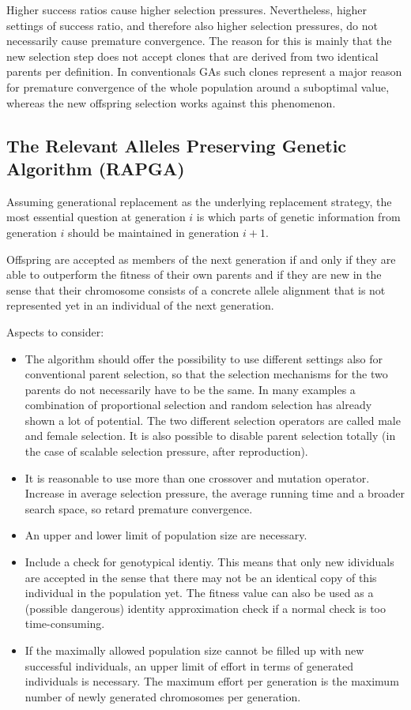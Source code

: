 \documentclass[12pt]{article}
\begin{document}
Higher success ratios cause higher selection pressures. Nevertheless, higher settings of success ratio, and therefore also higher selection pressures, do not necessarily cause premature convergence. The reason for this is mainly that the new selection step does not accept clones that are derived from two identical parents per definition. In conventionals GAs such clones represent a major reason for premature convergence of the whole population around a suboptimal value, whereas the new offspring selection works against this phenomenon.

\subsection{The Relevant Alleles Preserving Genetic Algorithm (RAPGA)}
Assuming generational replacement as the underlying replacement strategy, the most essential question at generation $i$ is which parts of genetic information from generation $i$ should be maintained in generation $i+1$.

Offspring are accepted as members of the next generation if and only if they are able to outperform the fitness of their own parents and if they are new in the sense that their chromosome consists of a concrete allele alignment that is not represented yet in an individual of the next generation.

Aspects to consider:
\begin{itemize}
\item The algorithm should offer the possibility to use different settings also for conventional parent selection, so that the selection mechanisms for the two parents do not necessarily have to be the same. In many examples a combination of proportional selection and random selection has already shown a lot of potential. The two different selection operators are called male and female selection. It is also possible to disable parent selection totally (in the case of scalable selection pressure, after reproduction).
\item It is reasonable to use more than one crossover and mutation operator. Increase in average selection pressure, the average running time and a broader search space, so retard premature convergence.
\item An upper and lower limit of population size are necessary.
\item Include a check for genotypical identiy. This means that only new idividuals are accepted in the sense that there may not be an identical copy of this individual in the population yet. The fitness value can also be used as a (possible dangerous) identity approximation check if a normal check is too time-consuming.
\item If the maximally allowed population size cannot be filled up with new successful individuals, an upper limit of effort in terms of generated individuals is necessary. The maximum effort per generation is the maximum number of newly generated chromosomes per generation.
\end{itemize}
\end{document}
